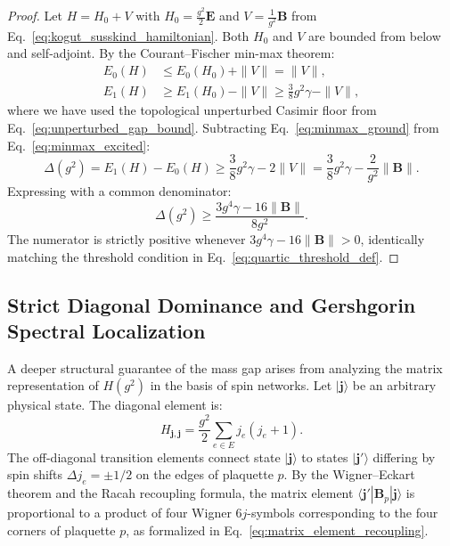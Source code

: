 \documentclass[11pt,reqno]{article}
\begin{document}
\begin{proof}
Let $H = H_0 + V$ with $H_0 = \frac{g^2}{2}\mathbf{E}$ and $V = \frac{1}{g^2}\mathbf{B}$ from Eq.~\eqref{eq:kogut_susskind_hamiltonian}. Both $H_0$ and $V$ are bounded from below and self-adjoint.
By the Courant--Fischer min-max theorem:
\begin{align}
    \label{eq:minmax_ground}
    E_0(H) &\le E_0(H_0) + \|V\| = \|V\|, \\
    \label{eq:minmax_excited}
    E_1(H) &\ge E_1(H_0) - \|V\| \ge \frac{3}{8} g^2 \gamma - \|V\|,
\end{align}
where we have used the topological unperturbed Casimir floor from Eq.~\eqref{eq:unperturbed_gap_bound}.
Subtracting Eq.~\eqref{eq:minmax_ground} from Eq.~\eqref{eq:minmax_excited}:
\begin{equation}
    \label{eq:gap_subtraction}
    \Delta(g^2) = E_1(H) - E_0(H) \ge \frac{3}{8} g^2 \gamma - 2 \|V\| = \frac{3}{8} g^2 \gamma - \frac{2}{g^2}\|\mathbf{B}\|.
\end{equation}
Expressing with a common denominator:
\begin{equation}
    \label{eq:gap_common_denominator}
    \Delta(g^2) \ge \frac{3 g^4 \gamma - 16 \|\mathbf{B}\|}{8 g^2}.
\end{equation}
The numerator is strictly positive whenever $3 g^4 \gamma - 16 \|\mathbf{B}\| > 0$, identically matching the threshold condition in Eq.~\eqref{eq:quartic_threshold_def}.
\end{proof}

\subsection{Strict Diagonal Dominance and Gershgorin Spectral Localization}
A deeper structural guarantee of the mass gap arises from analyzing the matrix representation of $H(g^2)$ in the basis of spin networks. Let $|\mathbf{j}\rangle$ be an arbitrary physical state. The diagonal element is:
\begin{equation}
    \label{eq:diagonal_casimir_matrix_elem}
    H_{\mathbf{j}, \mathbf{j}} = \frac{g^2}{2} \sum_{e \in E} j_e(j_e + 1).
\end{equation}
The off-diagonal transition elements connect state $|\mathbf{j}\rangle$ to states $|\mathbf{j}'\rangle$ differing by spin shifts $\Delta j_e = \pm 1/2$ on the edges of plaquette $p$.
By the Wigner--Eckart theorem and the Racah recoupling formula, the matrix element $\langle \mathbf{j}' | \mathbf{B}_p | \mathbf{j} \rangle$ is proportional to a product of four Wigner $6j$-symbols corresponding to the four corners of plaquette $p$, as formalized in Eq.~\eqref{eq:matrix_element_recoupling}.
\end{document}
